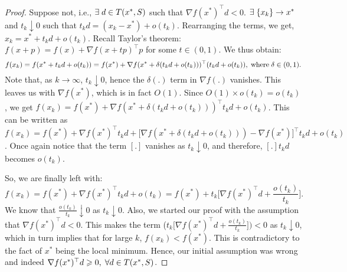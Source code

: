 \documentclass[twoside]{article}
\begin{document}
\begin{proof}
Suppose not, i.e., $\exists \hspace{1mm} d \in T(x^{*},S)$ such that $\nabla f(x^{*})^{\top}d < 0$. $\exists \hspace{1mm} \{x_{k}\} \rightarrow x^{*}$ and $t_{k} \downarrow 0$ such that $t_{k}d = (x_{k} - x^{*}) + o(t_{k})$. Rearranging the terms, we get, $x_{k} = x^{*} + t_{k}d + o(t_{k}) $. Recall Taylor's theorem:\\
$f(x+p) = f(x) + \nabla f(x+tp)^{\top}p$ for some $t \in (0,1)$. We thus obtain:
\begin{equation*}
f(x_{k}) = f(x^{*} +  t_{k}d + o(t_{k}))=   f(x^{*})+  \nabla f(x^{*} + \delta( t_{k}d + o(t_{k})))^{\top}(t_{k}d + o(t_{k})), \hspace{1mm} \textrm {where} \hspace{1mm} \delta \in (0,1).
\end{equation*}
Note that, as $k \rightarrow \infty$, $t_{k} \downarrow 0$, hence the $\delta(.)$ term in $\nabla f(.)$ vanishes. This leaves us with $\nabla f(x^{*})$, which is in fact $O(1)$. Since $O(1) \times o(t_{k}) = o(t_{k})$, we get
 $f(x_{k}) = f(x^{*})+  \nabla f(x^{*} + \delta( t_{k}d + o(t_{k})))^{\top}t_{k}d + o(t_{k}) $. This can be written as 
 $f(x_{k}) = f(x^{*}) + \nabla f(x^{*})^{\top}t_{k}d + \Big[\nabla f(x^{*} + \delta( t_{k}d + o(t_{k}))) - \nabla f(x^{*}) \Big]^{\top}t_{k}d + o(t_{k})$. Once again notice that the term $[.]$ vanishes as $t_{k} \downarrow 0$, and therefore, $[.] t_{k}d$ becomes $o(t_{k})$.\par
 So, we are finally left with:
 \begin{equation*}
 f(x_{k}) = f(x^{*}) + \nabla f(x^{*})^{\top}t_{k}d + o(t_{k}) = f(x^{*}) + t_{k}\bigg[\nabla f(x^{*})^{\top}d + \frac{o(t_{k})}{t_{k}}\bigg].     
 \end{equation*}
We know that $ \frac{o(t_{k})}{t_{k}}\downarrow 0$ as $t_{k} \downarrow 0$. Also, we started our proof with the assumption that $\nabla f(x^{*})^{\top}d < 0$. This makes the term \bigg($t_{k}\bigg[\nabla f(x^{*})^{\top}d + \frac{o(t_{k})}{t_{k}}\bigg]\bigg) < 0$ as $t_{k} \downarrow 0$, which in turn implies that for large $k$, $f(x_k) < f(x^*)$. This is contradictory to the fact of $x^*$ being the local minimum. Hence, our initial assumption was wrong and indeed $\nabla f(x^{*})^{\top}d \geqslant 0, \hspace{1mm}\forall d \in T(x^{*},S)$.
\end{proof}


\end{document}

